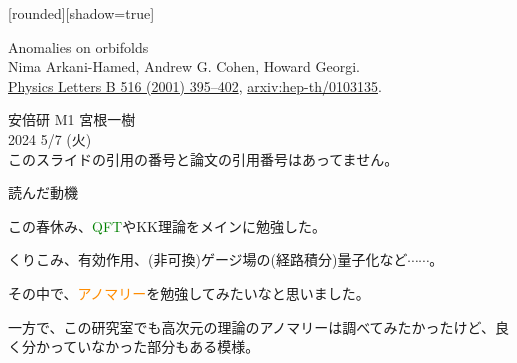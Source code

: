 \documentclass[
  unicode,a4paper,10pt,
  xcolor = {dvipsnames,svgnames},
  hyperref ={colorlinks=true,citecolor=Navy,linkcolor=NavyBlue,urlcolor=purple},
  ja=standard,lualatex
]{beamer}
\begin{document}
\nocite{Arkani-Hamed:2001uol}

\begin{frame}

  [rounded][shadow=true]
  \begin{block}{}
    \vspace*{5pt}

    \centering\Large
    Anomalies on orbifolds
    \\
    \normalsize
    Nima Arkani-Hamed, Andrew G. Cohen, Howard Georgi.
    \\
    \small
    \href{https://doi.org/10.1016/S0370-2693(01)00946-7}{Physics Letters B 516 (2001) 395–402},
    \href{https://doi.org/10.48550/arXiv.hep-th/0103135}{arxiv:hep-th/0103135}.

    \vspace*{5pt}
  \end{block}

  \begin{center}
    安倍研 M1 宮根一樹\\
    2024 5/7 (火)\\

    このスライドの引用の番号と論文の引用番号はあってません。
  \end{center}

\end{frame}


\begin{frame}{読んだ動機}

  この春休み、\textcolor{Green}{QFT}やKK理論をメインに勉強した。

  \vspace*{5pt}
  
  くりこみ、有効作用、(非可換)ゲージ場の(経路積分)量子化など$\cdots\cdots$。

  \vspace*{5pt}
  
  その中で、\textcolor{DarkOrange}{アノマリー}を勉強してみたいなと思いました。

  \vspace*{10pt}

  一方で、この研究室でも高次元の理論のアノマリーは調べてみたかったけど、良く分かっていなかった部分もある模様。\cite{Abe:2020vmv}

\end{frame}
\end{document}
